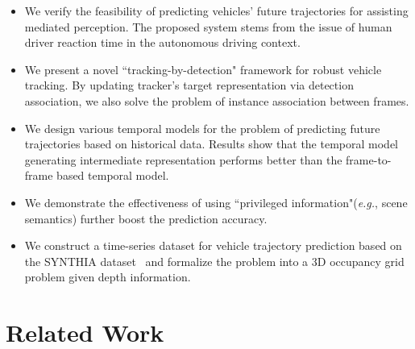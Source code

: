 \documentclass[10pt,twocolumn,letterpaper]{article}
\begin{document}
\begin{itemize}

\item We verify the feasibility of predicting vehicles' future trajectories for assisting mediated perception. The proposed system stems from the issue of human driver reaction time in the autonomous driving context.

\item We present a novel ``tracking-by-detection" framework for robust vehicle tracking. By updating tracker's target representation via detection association, we also solve the problem of instance association between frames.

\item We design various temporal models for the problem of predicting future trajectories based on historical data. Results show that the temporal model generating intermediate representation performs better than the frame-to-frame based temporal model.

\item We demonstrate the effectiveness of using ``privileged information"(\emph{e.g.}, scene semantics) further boost the prediction accuracy.


\item We construct a time-series dataset for vehicle trajectory prediction based on the SYNTHIA dataset~\cite{ros2016synthia} and  formalize the problem into a 3D occupancy grid problem given depth information.

\end{itemize}



\section{Related Work}

\end{document}
